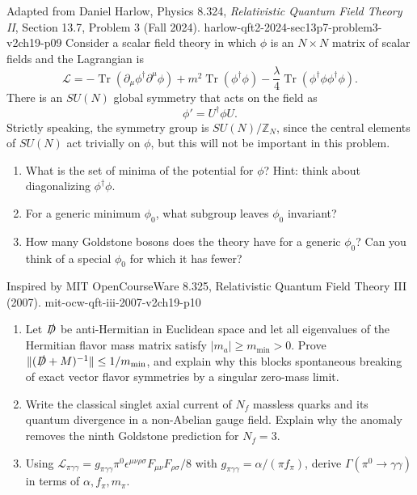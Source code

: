 \begin{enumerate}
  {Adapted from Daniel Harlow, Physics 8.324,
  \emph{Relativistic Quantum Field Theory II}, Section 13.7, Problem 3
  (Fall 2024).}
  {harlow-qft2-2024-sec13p7-problem3-v2ch19-p09}
  Consider a scalar field theory in which \(\phi\) is an \(N\times N\)
  matrix of scalar fields and the Lagrangian is
  \[
    \mathcal L
      =-\operatorname{Tr}(\partial_\mu\phi^\dagger\partial^\mu\phi)
       +m^2\operatorname{Tr}(\phi^\dagger\phi)
       -\frac{\lambda}{4}
        \operatorname{Tr}(\phi^\dagger\phi\phi^\dagger\phi).
  \]
  There is an \(SU(N)\) global symmetry that acts on the field as
  \[
    \phi' = U^\dagger\phi U.
  \]
  Strictly speaking, the symmetry group is \(SU(N)/\mathbb Z_N\), since the
  central elements of \(SU(N)\) act trivially on \(\phi\), but this will not
  be important in this problem.
  \begin{enumerate}
    \item[(a)]
    What is the set of minima of the potential for \(\phi\)? Hint: think
    about diagonalizing \(\phi^\dagger\phi\).
    \item[(b)]
    For a generic minimum \(\phi_0\), what subgroup leaves \(\phi_0\)
    invariant?
    \item[(c)]
    How many Goldstone bosons does the theory have for a generic \(\phi_0\)?
    Can you think of a special \(\phi_0\) for which it has fewer?
  \end{enumerate}

  {Inspired by MIT OpenCourseWare 8.325, Relativistic Quantum Field Theory III (2007).}
  {mit-ocw-qft-iii-2007-v2ch19-p10}
  \begin{enumerate}
    \item[(a)]
    Let \(\slashed D\) be anti-Hermitian in Euclidean space and let all
    eigenvalues of the Hermitian flavor mass matrix satisfy
    \(|m_a|\geq m_{\min}>0\).  Prove
    \(\|(\slashed D+M)^{-1}\|\leq1/m_{\min}\), and explain why this blocks
    spontaneous breaking of exact vector flavor symmetries by a singular
    zero-mass limit.
    \item[(b)]
    Write the classical singlet axial current of \(N_f\) massless quarks and
    its quantum divergence in a non-Abelian gauge field.  Explain why the
    anomaly removes the ninth Goldstone prediction for \(N_f=3\).
    \item[(c)]
    Using
    \(\mathcal L_{\pi\gamma\gamma}
      =g_{\pi\gamma\gamma}\pi^0
        \epsilon^{\mu\nu\rho\sigma}F_{\mu\nu}F_{\rho\sigma}/8\)
    with \(g_{\pi\gamma\gamma}=\alpha/(\pi f_\pi)\), derive
    \(\Gamma(\pi^0\to\gamma\gamma)\) in terms of
    \(\alpha,f_\pi,m_\pi\).
  \end{enumerate}


\end{enumerate}
